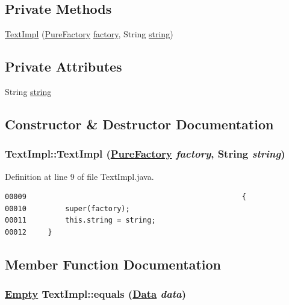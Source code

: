 \subsection*{Private Methods}
\begin{CompactItemize}
\item 
\hyperlink{classTextImpl_c0}{Text\-Impl} (\hyperlink{classPureFactory}{Pure\-Factory} \hyperlink{classDataImpl_o0}{factory}, String \hyperlink{classTextImpl_o0}{string})
\end{CompactItemize}
\subsection*{Private Attributes}
\begin{CompactItemize}
\item 
String \hyperlink{classTextImpl_o0}{string}
\end{CompactItemize}


\subsection{Constructor \& Destructor Documentation}
\hypertarget{classTextImpl_c0}{
\subsubsection[TextImpl]{\setlength{\rightskip}{0pt plus 5cm}Text\-Impl::Text\-Impl (\hyperlink{classPureFactory}{Pure\-Factory} {\em factory}, String {\em string})}}
\label{classTextImpl_c0}




Definition at line 9 of file Text\-Impl.java.\footnotesize\begin{verbatim}00009                                                  {
00010         super(factory);
00011         this.string = string;
00012     }
\end{verbatim}\normalsize 


\subsection{Member Function Documentation}
\hypertarget{classTextImpl_a1}{
\subsubsection[equals]{\setlength{\rightskip}{0pt plus 5cm}\hyperlink{interfaceEmpty}{Empty} Text\-Impl::equals (\hyperlink{interfaceData}{Data} {\em data})}}
\label{classTextImpl_a1}




